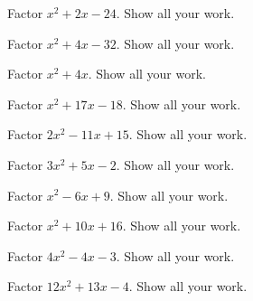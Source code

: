 \documentclass[11pt,letterpaper]{article}
\begin{document}

 Factor $x^2 + 2x - 24$. Show all your work. 





\newpage





 Factor $x^2 + 4x - 32$. Show all your work.





\newpage





 Factor $x^2 + 4x$. Show all your work. 





\newpage





 Factor $x^2 + 17x - 18$. Show all your work. 





\newpage





 Factor $2x^2 - 11x + 15$. Show all your work. 





\newpage





 Factor $3x^2 + 5x - 2$. Show all your work. 





\newpage





 Factor $x^2 - 6x + 9$. Show all your work. 





\newpage





 Factor $x^2 + 10x + 16$. Show all your work. 





\newpage





 Factor $4x^2 - 4x - 3$. Show all your work. 





\newpage





 Factor $12x^2 + 13x - 4$. Show all your work. 





\end{document}
